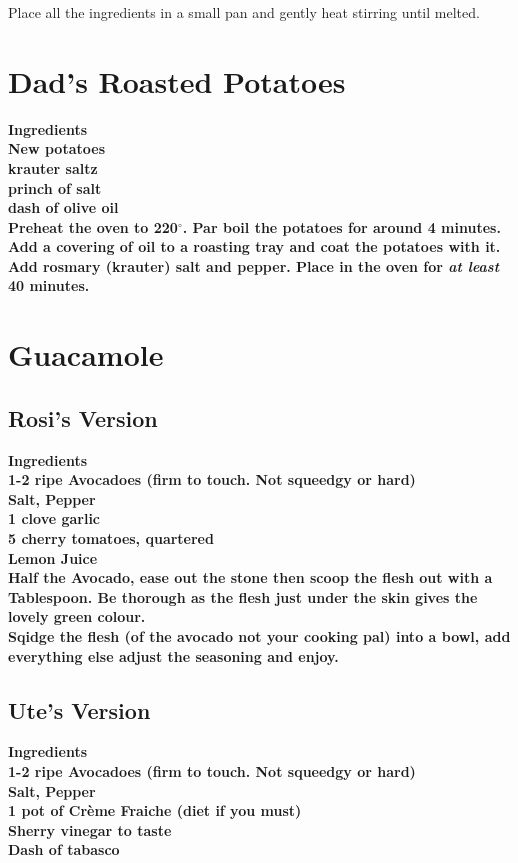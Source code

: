 \documentclass[18pt, oneside]{book}
\begin{document}
Place all the ingredients in a small pan and gently heat stirring until melted. 

\section{Dad's Roasted Potatoes}
\bf{Ingredients} \normalfont \\
New potatoes \\
krauter saltz \\
princh of salt \\
dash of olive oil \\

Preheat the oven to 220$^\circ$. Par boil the potatoes for around 4 minutes. Add a covering of oil to a roasting tray and coat the potatoes with it. Add rosmary (krauter) salt and pepper. Place in the oven for \textit{at least} 40 minutes. 

\section{Guacamole}
\label{guacamole}
\subsection*{Rosi's Version}

\bf{Ingredients} \normalfont \\
1-2 ripe Avocadoes (firm to touch. Not squeedgy or hard) \\
Salt, Pepper \\
1 clove garlic \\
5 cherry tomatoes, quartered \\
Lemon Juice \\

Half the Avocado, ease out the stone then scoop the flesh out with a Tablespoon. Be thorough as the flesh just under the skin gives the lovely green colour. \\

Sqidge the flesh  (of the avocado not your cooking pal) into a bowl, add everything else adjust the seasoning and enjoy.

\subsection*{Ute's Version}

\bf{Ingredients} \normalfont \\
1-2 ripe Avocadoes (firm to touch. Not squeedgy or hard) \\
Salt, Pepper \\
1 pot of Cr\`{e}me Fraiche (diet if you must) \\
Sherry vinegar to taste \\
Dash of tabasco \\
\end{document}
